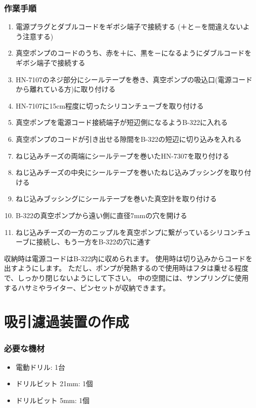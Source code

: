 \documentclass[titlepage,10pt,a4paper,uplatex]{jsbook}
\begin{document}
\subsubsection{作業手順}
\begin{enumerate}
\item 電源プラグとダブルコードをギボシ端子で接続する (＋と－を間違えないよう注意する)
\item 真空ポンプのコードのうち、赤を＋に、黒を－になるようにダブルコードをギボシ端子で接続する
\item HN-7107のネジ部分にシールテープを巻き、真空ポンプの吸込口(電源コードから離れている方)に取り付ける
\item HN-7107に15cm程度に切ったシリコンチューブを取り付ける
\item 真空ポンプを電源コード接続端子が短辺側になるようB-322に入れる
\item 真空ポンプのコードが引き出せる隙間をB-322の短辺に切り込みを入れる
\item ねじ込みチーズの両端にシールテープを巻いたHN-7307を取り付ける
\item ねじ込みチーズの中央にシールテープを巻いたねじ込みブッシングを取り付ける
\item ねじ込みブッシングにシールテープを巻いた真空計を取り付ける
\item B-322の真空ポンプから遠い側に直径7mmの穴を開ける
\item ねじ込みチーズの一方のニップルを真空ポンプに繋がっているシリコンチューブに接続し、もう一方をB-322の穴に通す
\end{enumerate}

収納時は電源コードはB-322内に収められます。
使用時は切り込みからコードを出すようにします。
ただし、ポンプが発熱するので使用時はフタは乗せる程度で、しっかり閉じないようにして下さい。
中の空間には、サンプリングに使用するハサミやライター、ピンセットが収納できます。

\section{吸引濾過装置の作成}\label{makingfilteringunit}

\subsubsection{必要な機材}
\begin{itemize}
\item 電動ドリル: 1台
\item ドリルビット 21mm: 1個
\item ドリルビット 5mm: 1個
\end{itemize}
\end{document}
